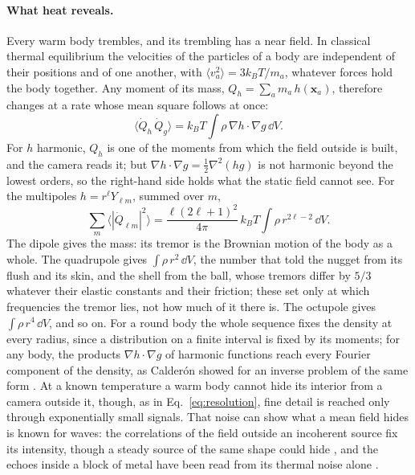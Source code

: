 \paragraph{What heat reveals.} Every warm body trembles, and its trembling has a
near field. In classical thermal equilibrium the velocities of the particles
of a body are independent of their positions and of one another, with
$\langle v_a^2\rangle = 3k_BT/m_a$, whatever forces hold the body together. Any
moment of its mass, $Q_h = \sum_a m_a\,h(\mathbf{x}_a)$, therefore changes at a
rate whose mean square follows at once:
\begin{equation}\label{eq:thermal-moment}
\langle \dot Q_h\,\dot Q_g\rangle = k_BT\int\rho\,\nabla h\cdot\nabla g\,\dd V .
\end{equation}
For $h$ harmonic, $Q_h$ is one of the moments from which the field outside is
built, and the camera reads it; but $\nabla h\cdot\nabla g = \tfrac12\nabla^2(hg)$
is not harmonic beyond the lowest orders, so the right-hand side holds what the
static field cannot see. For the multipoles $h = r^\ell Y_{\ell m}$, summed over $m$,
\begin{equation}\label{eq:thermal-multipole}
\sum_m\langle|\dot Q_{\ell m}|^2\rangle = \frac{\ell(2\ell+1)^2}{4\pi}\,k_BT
\int\rho\,r^{2\ell-2}\,\dd V .
\end{equation}
The dipole gives the mass: its tremor is the Brownian motion of the body as a
whole. The quadrupole gives $\int\rho\,r^2\,\dd V$, the number that told the
nugget from its flush and its skin, and the shell from the ball, whose
tremors differ by $5/3$ whatever their elastic constants and their friction;
these set only at which frequencies the tremor lies, not how much of it there
is. The octupole gives $\int\rho\,r^4\,\dd V$, and so on. For a round body the
whole sequence fixes the density at every radius, since a
distribution on a finite interval is fixed by its moments; for any body, the
products $\nabla h\cdot\nabla g$ of harmonic functions reach every Fourier
component of the density, as Calder\'on showed for an inverse problem of the
same form \cite{Calderon1980}. At a known temperature a warm body cannot hide
its interior from a camera outside it, though, as in Eq.~\eqref{eq:resolution},
fine detail is reached only through exponentially small signals. That noise can
show what a mean field hides is known for waves: the correlations of the field
outside an incoherent source fix its intensity, though a steady source of the
same shape could hide \cite{Devaney1979}, and the echoes inside a block of metal
have been read from its thermal noise alone \cite{WeaverLobkis2001}.

